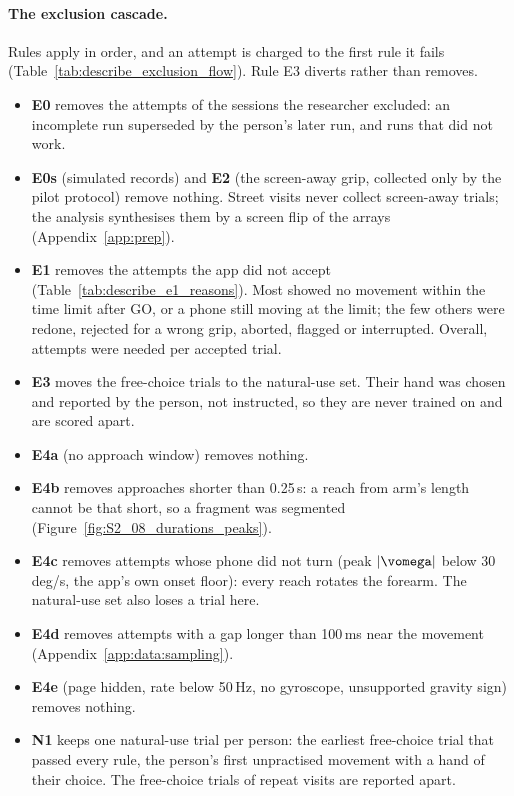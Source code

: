 \paragraph{The exclusion cascade.} Rules apply in order, and an attempt is charged to the first rule it fails
(Table~\ref{tab:describe_exclusion_flow}). Rule E3 diverts rather than removes.
\begin{itemize}[nosep]
  \item \textbf{E0} removes the  attempts of the sessions the researcher excluded:
    an incomplete run superseded by the person's later run, and runs that did not work.
  \item \textbf{E0s} (simulated records) and \textbf{E2} (the screen-away grip, collected only by the pilot
    protocol) remove nothing. Street visits never collect screen-away trials; the analysis synthesises them by
    a screen flip of the arrays (Appendix~\ref{app:prep}).
  \item \textbf{E1} removes the  attempts the app did not accept
    (Table~\ref{tab:describe_e1_reasons}). Most showed no movement within the time limit after GO, or a phone
    still moving at the limit; the few others were redone, rejected for a wrong grip, aborted, flagged or
    interrupted. Overall,  attempts were needed per accepted trial.
  \item \textbf{E3} moves the  free-choice trials to the natural-use set. Their
    hand was chosen and reported by the person, not instructed, so they are never trained on and are scored
    apart.
  \item \textbf{E4a} (no approach window) removes nothing.
  \item \textbf{E4b} removes  approaches shorter than 0.25\,s: a reach from arm's
    length cannot be that short, so a fragment was segmented (Figure~\ref{fig:S2_08_durations_peaks}).
  \item \textbf{E4c} removes  attempts whose phone did not turn (peak $|\vomega|$
    below 30\,deg/s, the app's own onset floor): every reach rotates the forearm. The natural-use set also
    loses a trial here.
  \item \textbf{E4d} removes  attempts with a gap longer than 100\,ms near the
    movement (Appendix~\ref{app:data:sampling}).
  \item \textbf{E4e} (page hidden, rate below 50\,Hz, no gyroscope, unsupported gravity sign) removes nothing.
  \item \textbf{N1} keeps one natural-use trial per person: the earliest free-choice trial that passed every
    rule, the person's first unpractised movement with a hand of their choice. The
     free-choice trials of repeat visits are reported apart.
\end{itemize}

